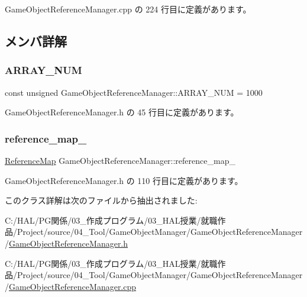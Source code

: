  Game\+Object\+Reference\+Manager.\+cpp の 224 行目に定義があります。



\subsection{メンバ詳解}
\mbox{\label{class_game_object_reference_manager_a962d30b10c5b76353645773b2c1740ce}} 
\subsubsection{\texorpdfstring{A\+R\+R\+A\+Y\+\_\+\+N\+UM}{ARRAY\_NUM}}
{\footnotesize\ttfamily const unsigned Game\+Object\+Reference\+Manager\+::\+A\+R\+R\+A\+Y\+\_\+\+N\+UM = 1000\hspace{0.3cm}{\ttfamily [static]}}



 Game\+Object\+Reference\+Manager.\+h の 45 行目に定義があります。

\mbox{\label{class_game_object_reference_manager_a1aa067e575ad467741f671fd867e5638}} 
\subsubsection{\texorpdfstring{reference\+\_\+map\+\_\+}{reference\_map\_}}
{\footnotesize\ttfamily \mbox{\hyperlink{struct_game_object_reference_manager_1_1_reference_map}{Reference\+Map}} Game\+Object\+Reference\+Manager\+::reference\+\_\+map\+\_\+\hspace{0.3cm}{\ttfamily [private]}}



 Game\+Object\+Reference\+Manager.\+h の 110 行目に定義があります。



このクラス詳解は次のファイルから抽出されました\+:\begin{DoxyCompactItemize}
\item 
C\+:/\+H\+A\+L/\+P\+G関係/03\+\_\+作成プログラム/03\+\_\+\+H\+A\+L授業/就職作品/\+Project/source/04\+\_\+\+Tool/\+Game\+Object\+Manager/\+Game\+Object\+Reference\+Manager/\mbox{\hyperlink{_game_object_reference_manager_8h}{Game\+Object\+Reference\+Manager.\+h}}\item 
C\+:/\+H\+A\+L/\+P\+G関係/03\+\_\+作成プログラム/03\+\_\+\+H\+A\+L授業/就職作品/\+Project/source/04\+\_\+\+Tool/\+Game\+Object\+Manager/\+Game\+Object\+Reference\+Manager/\mbox{\hyperlink{_game_object_reference_manager_8cpp}{Game\+Object\+Reference\+Manager.\+cpp}}\end{DoxyCompactItemize}
